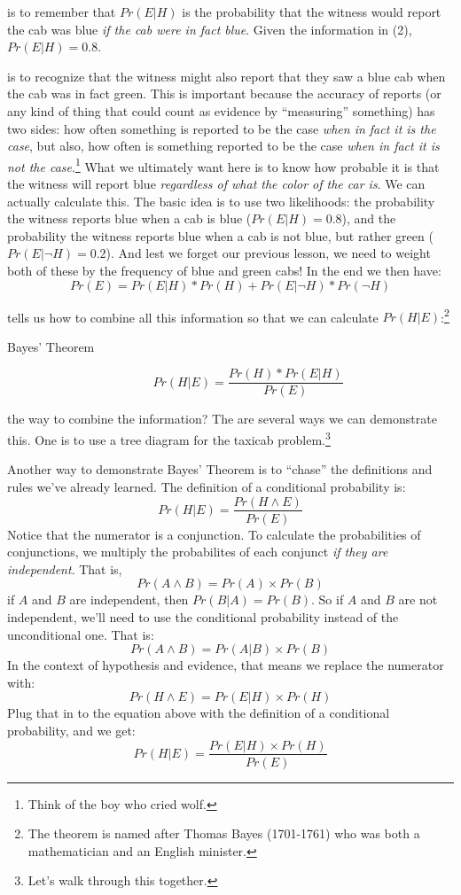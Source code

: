\documentclass[]{tufte-book}
\begin{document}
 is to remember that \(Pr(E|H)\) is the probability that the witness would report the cab was blue \emph{if the cab were in fact blue}. Given the information in (2), \(Pr(E|H)= 0.8\).

 is to recognize that the witness might also report that they saw a blue cab when the cab was in fact green. This is important because the accuracy of reports (or any kind of thing that could count as evidence by ``measuring'' something) has two sides: how often something is reported to be the case \emph{when in fact it is the case}, but also, how often is something reported to be the case \emph{when in fact it is not the case}.\footnote{Think of the boy who cried wolf.} What we ultimately want here is to know how probable it is that the witness will report blue \emph{regardless of what the color of the car is}. We can actually calculate this. The basic idea is to use two likelihoods: the probability the witness reports blue when a cab is blue (\(Pr(E|H)=0.8\)), and the probability the witness reports blue when a cab is not blue, but rather green (\(Pr(E|\neg H)=0.2\)). And lest we forget our previous lesson, we need to weight both of these by the frequency of blue and green cabs! In the end we then have:
\[
Pr(E) = Pr(E|H)*Pr(H) + Pr(E|\neg H)*Pr(\neg H)
\]

 tells us how to combine all this information so that we can calculate \(Pr(H|E)\):\footnote{The theorem is named after Thomas Bayes (1701-1761) who was both a mathematician and an English minister.}

\begin{description}
\item[Bayes' Theorem]
\[Pr(H|E) = \frac{Pr(H)*Pr(E|H)}{Pr(E)}\]
\end{description}

 the way to combine the information? The are several ways we can demonstrate this. One is to use a tree diagram for the taxicab problem.\footnote{Let's walk through this together.}

Another way to demonstrate Bayes' Theorem is to ``chase'' the definitions and rules we've already learned. The definition of a conditional probability is:
\[
Pr(H|E) = \frac{Pr(H\wedge E)}{Pr(E)}
\]
Notice that the numerator is a conjunction. To calculate the probabilities of conjunctions, we multiply the probabilites of each conjunct \emph{if they are independent}. That is,
\[
Pr(A\wedge B) = Pr(A)\times Pr(B)
\]
 if \(A\) and \(B\) are independent, then \(Pr(B|A)=Pr(B)\). So if \(A\) and \(B\) are not independent, we'll need to use the conditional probability instead of the unconditional one. That is:
\[
Pr(A\wedge B) = Pr(A|B)\times Pr(B)
\]
In the context of hypothesis and evidence, that means we replace the numerator with:
\[
Pr(H\wedge E) = Pr(E|H)\times Pr(H)
\]
Plug that in to the equation above with the definition of a conditional probability, and we get:
\[
Pr(H|E) = \frac{Pr(E|H)\times Pr(H)}{Pr(E)}
\]
\end{document}
